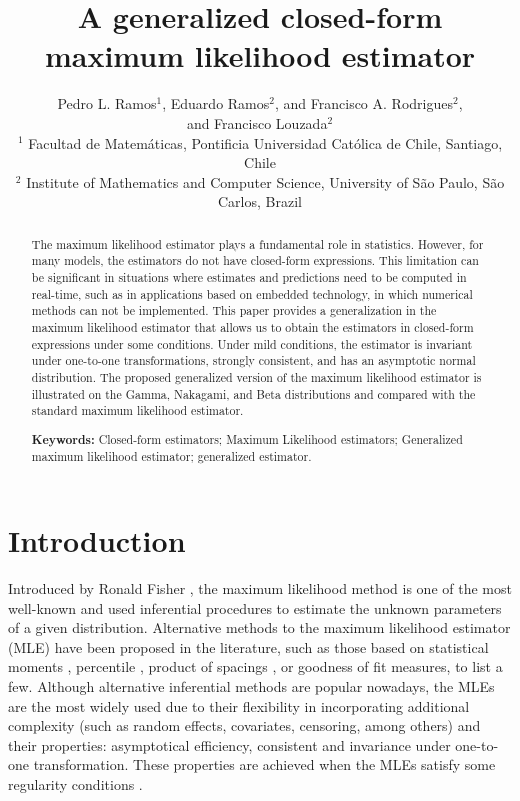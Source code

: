 \documentclass[10pt,a4paper,onecolumn]{article} %
\title{A generalized closed-form maximum likelihood estimator}
\author{
Pedro L. Ramos$^1$, Eduardo Ramos$^2$, and Francisco A. Rodrigues$^2$, \\ and Francisco Louzada$^2$ \\  
\normalsize{$^{1}$ Facultad de Matemáticas, Pontificia Universidad Católica de Chile, Santiago, Chile} \\  
\normalsize{$^{2}$ Institute of Mathematics and Computer Science, University of S\~ao Paulo, S\~ao Carlos, Brazil}
}
\begin{document}
\maketitle

\begin{abstract}
The maximum likelihood estimator plays a fundamental role in statistics. However, for many models, the estimators do not have closed-form expressions. This limitation can be significant in situations where estimates and predictions need to be computed in real-time, such as in applications based on embedded technology, in which numerical methods can not be implemented. This paper provides a generalization in the maximum likelihood estimator that allows us to obtain the estimators in closed-form expressions under some conditions. Under mild conditions, the estimator is invariant under one-to-one transformations, strongly consistent, and has an asymptotic normal distribution. The proposed generalized version of the maximum likelihood estimator is illustrated on the Gamma, Nakagami, and Beta distributions and compared with the standard maximum likelihood estimator.

\noindent \textbf{Keywords:} Closed-form estimators; Maximum Likelihood estimators; Generalized maximum likelihood estimator; generalized estimator.
\end{abstract}



\section{Introduction}

Introduced by Ronald Fisher \citep{aldrich1997ra}, the maximum likelihood method is one of the most well-known and used inferential procedures to estimate the unknown parameters of a given distribution. 
Alternative methods to the maximum likelihood estimator (MLE) have been proposed in the literature, such as those based on statistical moments \citep{hosking1990moments}, percentile \citep{kao1,kao2}, product of spacings \citep{Cheng2}, or goodness of fit measures, to list a few. Although alternative inferential methods are popular nowadays, the MLEs are the most widely used due to their flexibility in incorporating additional complexity (such as random effects, covariates, censoring, among others) and their properties: asymptotical efficiency, consistent and invariance under one-to-one transformation. These properties are achieved when the MLEs satisfy some regularity conditions  \citep{2004-Bierens, 2006-Lehmann,redner1981note}.
\end{document}
